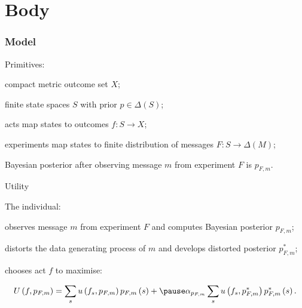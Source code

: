 \documentclass[usenames,dvipsnames,aspectratio=169,11pt, envcountsect]{beamer}
\begin{document}
\section{Body}

\begin{frame}\frametitle{Model}

	Primitives:

	\vfill

	\begin{wideitemize}
		\item
		compact metric outcome set \(X\); \pause
		\item
		finite state spaces \(S\) with prior \( p \in \Delta \left( S \right) \); \pause
		\item
		acts map states to outcomes \(f: S \longrightarrow X \); \pause
		\item experiments map states to finite distribution of messages \( F : S \rightarrow \Delta \left( M \right) \); \pause
		\item Bayesian posterior after observing message \( m \) from experiment \( F \) is \( p_{F,m} \).
	\end{wideitemize}
\end{frame}

\begin{frame}{Utility}

	The individual:

	\vfill

	\begin{wideenumerate}
		\item observes message \( m \) from experiment \( F \) and computes Bayesian posterior \( p_{F,m} \);
		\item distorts the data generating process of \( m \) and develops distorted posterior \( p^{*}_{F,m} \); \pause
		\item chooses act \( f \) to maximise:
	\end{wideenumerate}

	\vfill

	\[
		U \left( f, p_{F,m} \right) = \sum_{s} u \left( f_s, p_{F,m} \right) p_{F,m} \left( s \right) + \pause \alpha_{p_{F,m}} \sum_{s} u \left( f_s, p^{*}_{F,m} \right) p^{*}_{F,m} \left( s \right) .
	\]

\end{frame}
\end{document}
